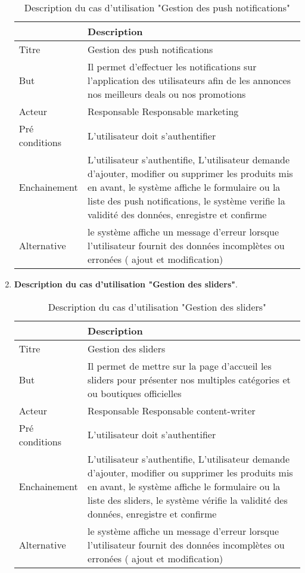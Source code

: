 \begin{enumerate}
	\begin{table}[H]
	\caption{Description du cas d'utilisation "Gestion des push notifications"}
	\label{Description du cas d'utilisation "Gestion des push notifications"}
	\centering
	\begin{tabularx}{\linewidth}{|X|X|}
		\hline \rowcolor{lightgray}  
		\textbf  \textbf{ } & \textbf{Description}\\
		\hline
		 Titre &  Gestion des push notifications\\
		\hline
		But & Il permet d’effectuer les notifications sur l’application des utilisateurs afin de les annonces nos meilleurs deals ou nos promotions\\
		\hline
		 Acteur  & Responsable Responsable marketing \\
		\hline
		 Pré conditions &  L'utilisateur doit s'authentifier \\	
		\hline		
		 Enchainement &  L'utilisateur s'authentifie, L'utilisateur demande d'ajouter, modifier ou supprimer les produits mis en avant, le système affiche le formulaire ou la liste des push notifications, le système verifie la validité des données, enregistre et confirme \\	
		\hline			
		 Alternative & le système affiche un message d'erreur lorsque l'utilisateur fournit des données incomplètes ou erronées ( ajout et modification) \\	
		\hline			
	\end{tabularx}
\end{table}

\item  \textbf{Description du cas d'utilisation "Gestion des sliders"}.

	\begin{table}[H]
	\caption{Description du cas d'utilisation "Gestion des sliders"}
	\label{Description du cas d'utilisation "Gestion des sliders"}
	\centering
	\begin{tabularx}{\linewidth}{|X|X|}
		\hline \rowcolor{lightgray}  
		\textbf  \textbf{ } & \textbf{Description}\\
		\hline
		 Titre &  Gestion des sliders\\
		\hline
		But & Il permet de mettre sur la page d’accueil les sliders pour présenter nos multiples catégories et ou boutiques officielles  \\
		\hline
		 Acteur  & Responsable Responsable content-writer \\
		\hline
		 Pré conditions &  L'utilisateur doit s'authentifier \\	
		\hline		
		 Enchainement &  L'utilisateur s'authentifie, L'utilisateur demande d'ajouter, modifier ou supprimer les produits mis en avant, le système affiche le formulaire ou la liste des sliders, le système vérifie la validité des données, enregistre et confirme \\	
		\hline			
		 Alternative & le système affiche un message d'erreur lorsque l'utilisateur fournit des données incomplètes ou erronées ( ajout et modification) \\	
		\hline			
	\end{tabularx}
\end{table}
\end{enumerate}

